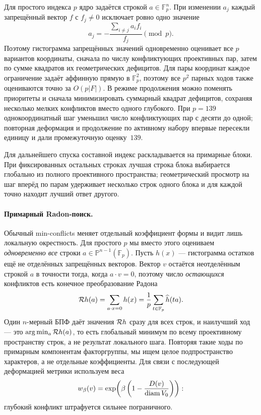 Для простого индекса $p$ ядро задаётся строкой
$a\in\mathbb F_p^n$. При изменении $a_j$ каждый запрещённый вектор $f$ с
$f_j\ne0$ исключает ровно одно значение
\[
a_j=-\frac{\sum_{i\ne j}a_i f_i}{f_j}\pmod p.
\]
Поэтому гистограмма запрещённых значений одновременно оценивает все $p$
вариантов координаты, сначала по числу конфликтующих проективных пар, затем по
сумме квадратов их геометрических дефицитов. Для пары координат каждое
ограничение задаёт аффинную прямую в $\mathbb F_p^2$, поэтому все $p^2$ парных
ходов также оцениваются точно за $O(p|F|)$. В режиме продолжения можно поменять
приоритеты и сначала минимизировать суммарный квадрат дефицитов, сохраняя
несколько мелких конфликтов вместо одного глубокого. При $p=139$
однокоординатный шаг уменьшил число конфликтующих пар с десяти до одной;
повторная деформация и продолжение по активному набору впервые пересекли единицу и дали
промежуточную оценку~$139$.

Для дальнейшего спуска составной индекс раскладывается на примарные блоки.
При фиксированных остальных строках лучшая строка блока выбирается глобально
из полного проективного пространства; геометрический просмотр на шаг вперёд по парам удерживает
несколько строк одного блока и для каждой точно находит лучший ответ другого.

\paragraph{Примарный Radon-поиск.} Обычный min-conflicts меняет отдельный
коэффициент формы и видит лишь локальную окрестность. Для простого $p$ мы вместо
этого оцениваем \emph{одновременно все} строки
$a\in\mathbb P^{n-1}(\mathbb F_p)$. Пусть $h(x)$ --- гистограмма остатков ещё не
отделённых запрещённых векторов. Вектор $v$ остаётся неотделённым строкой $a$ в
точности тогда, когда $a\cdot v=0$, поэтому число \emph{остающихся} конфликтов
есть конечное преобразование Радона
\[
 {\cal R}h(a)=\sum_{a\cdot x=0}h(x)
 =\frac1p\sum_{t\in\mathbb F_p}\widehat h(ta).
\]
Один $n$-мерный БПФ даёт значения ${\cal R}h$ сразу для всех строк, и наилучший
ход --- это $\arg\min_a{\cal R}h(a)$, то есть глобальный минимум по всему
проективному пространству строк, а не результат локального шага.
Повторяя такие ходы по примарным компонентам факторгруппы, мы ищем целое подпространство характеров, а не отдельные коэффициенты. Для
связи с последующей деформацией метрики используем веса
\[
 w_\beta(v)=\exp\!\left(\beta\left(1-
 \frac{D(v)}{\operatorname{diam} V_0}\right)\right):
\]
глубокий конфликт штрафуется сильнее пограничного.

